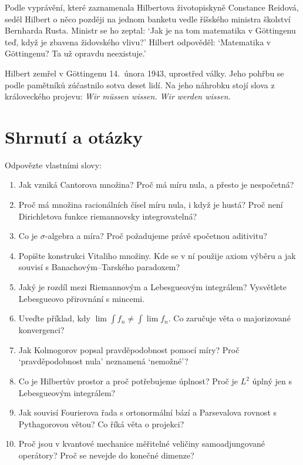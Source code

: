Podle vyprávění, které zaznamenala Hilbertova životopiskyně Constance Reidová, seděl Hilbert o něco později na jednom banketu vedle říšského ministra školství Bernharda Rusta. Ministr se ho zeptal: `Jak je na tom matematika v Göttingenu teď, když je zbavena židovského vlivu?' Hilbert odpověděl: `Matematika v Göttingenu? Ta už opravdu neexistuje.'

Hilbert zemřel v Göttingenu 14.~února 1943, uprostřed války. Jeho pohřbu se podle pamětníků zúčastnilo sotva deset lidí. Na jeho náhrobku stojí slova z královeckého projevu: \textit{Wir müssen wissen. Wir werden wissen.}

\section{Shrnutí a otázky}

\begin{problem}
  Odpovězte vlastními slovy:
  \begin{enumerate}
    \item Jak vzniká Cantorova množina? Proč má míru nula, a přesto je nespočetná?
    \item Proč má množina racionálních čísel míru nula, i když je hustá? Proč není Dirichletova funkce riemannovsky integrovatelná?
    \item Co je $\sigma$-algebra a míra? Proč požadujeme právě spočetnou aditivitu?
    \item Popište konstrukci Vitaliho množiny. Kde se v ní použije axiom výběru a jak souvisí s Banachovým--Tarského paradoxem?
    \item Jaký je rozdíl mezi Riemannovým a Lebesgueovým integrálem? Vysvětlete Lebesgueovo přirovnání s mincemi.
    \item Uveďte příklad, kdy $\lim\int f_n\neq\int\lim f_n$. Co zaručuje věta o majorizované konvergenci?
    \item Jak Kolmogorov popsal pravděpodobnost pomocí míry? Proč `pravděpodobnost nula' neznamená `nemožné'?
    \item Co je Hilbertův prostor a proč potřebujeme úplnost? Proč je $L^2$ úplný jen s Lebesgueovým integrálem?
    \item Jak souvisí Fourierova řada s ortonormální bází a Parsevalova rovnost s Pythagorovou větou? Co říká věta o projekci?
    \item Proč jsou v kvantové mechanice měřitelné veličiny samoadjungované operátory? Proč se nevejde do konečné dimenze?
  \end{enumerate}
\end{problem}
